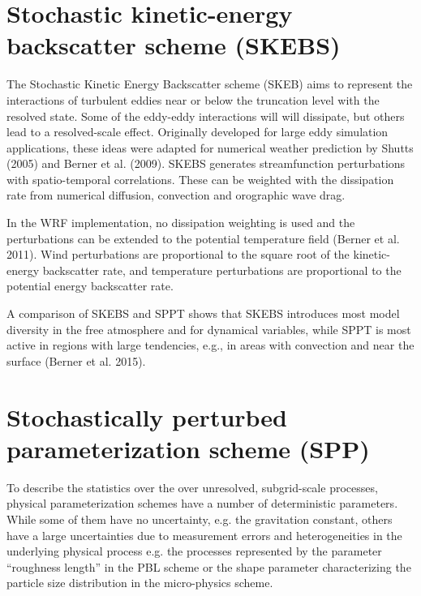 \section{Stochastic kinetic-energy backscatter scheme (SKEBS)}
The Stochastic Kinetic Energy Backscatter scheme (SKEB) aims to represent
the interactions of turbulent eddies near or below the
truncation level with the resolved state. Some of the eddy-eddy interactions will
will dissipate, but others lead to a resolved-scale effect.
Originally developed for large eddy simulation applications, these ideas were 
adapted for numerical weather prediction by Shutts (2005) and Berner et al. (2009).
SKEBS generates streamfunction perturbations with spatio-temporal correlations. These
can be weighted with the dissipation rate from numerical diffusion, convection and orographic 
wave drag. 

In the WRF implementation, no dissipation weighting is used and the 
perturbations can be extended to the potential temperature field (Berner et al. 2011).  
Wind perturbations are proportional to the square
root of the kinetic-energy backscatter rate, and temperature
perturbations are proportional to the potential energy backscatter rate.

A comparison of SKEBS and SPPT shows that SKEBS introduces most model diversity in the 
free atmosphere and for dynamical variables, 
while SPPT is most active in regions with large tendencies, e.g., in areas with convection 
and near the surface (Berner et al. 2015).
\section {Stochastically perturbed parameterization scheme (SPP)}
To describe the statistics over the over unresolved, subgrid-scale processes, 
physical parameterization schemes have a number of deterministic parameters.
While some of them have no uncertainty, e.g. the gravitation constant, 
others have a large uncertainties due to 
measurement errors and heterogeneities in the underlying physical process
e.g. the processes represented by the parameter ``roughness length'' in the PBL scheme or
the shape parameter characterizing the particle size distribution in the micro-physics 
scheme.  

